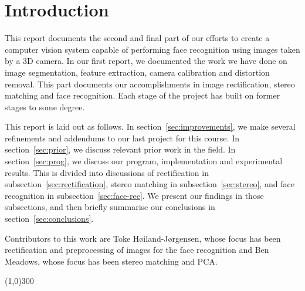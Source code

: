 
\section{Introduction}
This report documents the second and final part of our efforts to create a computer vision
system capable of performing face recognition using images taken by a 3D camera. In our
first report, we documented the work we have done on image segmentation,
feature extraction, camera calibration and distortion removal. This part
documents our accomplishments in image rectification, stereo matching and face
recognition. Each stage of the project has built on former stages to some degree.

This report is laid out as follows. In section~\ref{sec:improvements}, we make
several refinements and addendums to our last project for this course. In
section~\ref{sec:prior}, we discuss relevant prior work in the field. In
section~\ref{sec:prog}, we discuss our program, implementation and experimental
results. This is divided into discussions of rectification in
subsection~\ref{sec:rectification}, stereo matching in
subsection~\ref{sec:stereo}, and face recognition in
subsection~\ref{sec:face-rec}. We present our findings in those subsections, and
then briefly summarise our conclusions in section~\ref{sec:conclusions}.

Contributors to this work are Toke Høiland-Jørgensen, whose focus has been
rectification and preprocessing of images for the face recognition and
Ben Meadows, whose focus has been stereo matching and PCA.

\begin{center}
\line(1,0){300}
\end{center}

